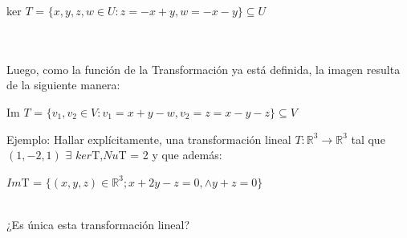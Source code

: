 \documentclass[12pt]{article}
\begin{document}
\begin{center}
\therfore ker $T$ = $\{x,y,z,w \in U: z = -x+y, w = -x-y\} \subseteq U$
\end{center}
\\
\\
Luego, como la función de la Transformación ya está definida, la imagen resulta de la
siguiente manera:
\begin{center}
\therfore Im $T$ = $\{v_1,v_2 \in V: v_1 = x+y-w, v_2 = z = x-y-z\} \subseteq V$
\end{center}

Ejemplo: Hallar explícitamente, una transformación lineal $T:\mathbb{R}^3 \to \mathbb{R}^3$
tal que $(1,-2,1)$ $\exists$ $ker$T,$Nu$T = 2 y que además:
\begin{center}
	$Im$T = $\{(x,y,z) \in \mathbb{R}^3; x+2y-z = 0, \wedge y+z = 0\}$
\end{center}
\\
¿Es única esta transformación lineal?


\\
\end{document}
